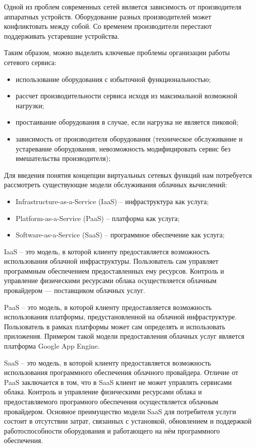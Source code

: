 \documentclass[oneside,final,14pt,a4paper]{extreport}
\begin{document}
Одной из проблем современных сетей является зависимость от производителя аппаратных устройств. Оборудование разных производителей может конфликтовать между собой. Со временем производители перестают поддерживать устаревшие устройства.

Таким образом, можно выделить ключевые проблемы организации работы сетевого сервиса:
\begin{itemize}
	\item использование оборудования с избыточной функциональностью;
	\item рассчет производительности сервиса исходя из максимальной возможной нагрузки;
	\item простаивание оборудования в случае, если нагрузка не является пиковой;
	\item зависимость от производителя оборудования (техническое обслуживание и устаревание оборудования, невозможность модифицировать сервис без вмешательства производителя);
\end{itemize}

Для введения понятия концепции виртуальных сетевых функций нам потребуется рассмотреть существующие модели обслуживания облачных вычислений: 
\begin{itemize}
	\item Infrastructure-as-a-Service (IaaS) -- инфраструктура как услуга;
	\item Platform-as-a-Service (PaaS) --  платформа как услуга;
	\item Software-as-a-Service (SaaS) -- программное обеспечение как услуга;
\end{itemize}

IaaS -- это модель, в которой клиенту предоставляется возможность использования облачной инфраструктуры. Пользователь сам управляет программным обеспечением предоставленных ему ресурсов. Контроль и управление физическими ресурсами облака осуществляется облачным провайдером --- поставщиком облачных услуг.

PaaS -- это модель, в которой клиенту предоставляется возможность использования платформы, предустановленной на облачной инфраструктуре. Пользователь в рамках платформы может сам определять и использовать приложения. Примером такой модели предоставления облачных услуг является платформа Google App Engine.\cite{bib:google-app-engine}

SaaS -- это модель, в которой клиенту предоставляется возможность использования программного обеспечения облачного провайдера. Отличие от PaaS заключается в том, что в SaaS клиент не может управлять сервисами облака.  Контроль и управление физическими ресурсами облака и предоставляемого програмного обеспечения осуществляется облачным провайдером. Основное преимущество модели SaaS для потребителя услуги состоит в отсутствии затрат, связанных с установкой, обновлением и поддержкой работоспособности оборудования и работающего на нём программного обеспечения.~\cite{bib:saas}
\end{document}
